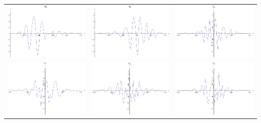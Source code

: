 \documentclass{article}
\begin{document}
\begin{landscape}
\begin{tabular}{ccc}
\includegraphics[width=6.7cm]{biquadratic_wavelet_4.pdf}& \includegraphics[width=6.7cm]{biquadratic_wavelet_5.pdf}& \includegraphics[width=6.7cm]{biquadratic_wavelet_6.pdf} \\
\includegraphics[width=6.7cm]{biquadratic_wavelet_7.pdf}& \includegraphics[width=6.7cm]{biquadratic_wavelet_8.pdf}& \includegraphics[width=6.7cm]{biquadratic_wavelet_9.pdf} \\
\end{tabular} 
 \end{landscape}
\end{document}
